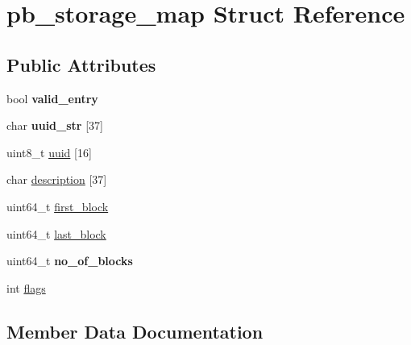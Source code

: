 \hypertarget{structpb__storage__map}{}\section{pb\+\_\+storage\+\_\+map Struct Reference}
\label{structpb__storage__map}
\subsection*{Public Attributes}
\begin{DoxyCompactItemize}
\item 
\mbox{\label{structpb__storage__map_a19212e332b8d5e268a8c9b518e041ae9}} 
bool {\bfseries valid\+\_\+entry}
\item 
\mbox{\label{structpb__storage__map_a8d41bf23d81e8e05ea68102730061f51}} 
char {\bfseries uuid\+\_\+str} \mbox{[}37\mbox{]}
\item 
uint8\+\_\+t \hyperlink{structpb__storage__map_a0491349496d1cda5ccc5b80309acb510}{uuid} \mbox{[}16\mbox{]}
\item 
char \hyperlink{structpb__storage__map_ac42d2ba42fc7243da9cf33683e0e057a}{description} \mbox{[}37\mbox{]}
\item 
uint64\+\_\+t \hyperlink{structpb__storage__map_a0186dcefcc1c5e2554ccfb369c213a62}{first\+\_\+block}
\item 
uint64\+\_\+t \hyperlink{structpb__storage__map_a22da423ce1fa0596f6fab325c73e8230}{last\+\_\+block}
\item 
\mbox{\label{structpb__storage__map_af6eeed5a091c62b2c38f7923657581ec}} 
uint64\+\_\+t {\bfseries no\+\_\+of\+\_\+blocks}
\item 
int \hyperlink{structpb__storage__map_a766fb83ed4a54c8e04242ed9ff7acaff}{flags}
\end{DoxyCompactItemize}


\subsection{Member Data Documentation}
\mbox{\label{structpb__storage__map_ac42d2ba42fc7243da9cf33683e0e057a}} 
